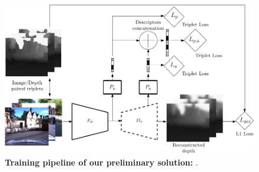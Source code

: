 \begin{figure}
	\centering
	
	\includegraphics[width=\linewidth]{preliminary/preliminary_method}
	
	\caption[Preliminary solution]{\label{fig:preliminary_method} \textbf{Training pipeline of our preliminary solution:} .}
	
\end{figure}